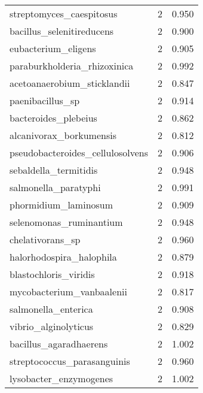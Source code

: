 \begin{tabular}{lrr}
                    streptomyces\_caespitosus &                   2 &     0.950 \\
                   bacillus\_selenitireducens &                   2 &     0.900 \\
                         eubacterium\_eligens &                   2 &     0.905 \\
                paraburkholderia\_rhizoxinica &                   2 &     0.992 \\
                 acetoanaerobium\_sticklandii &                   2 &     0.847 \\
                            paenibacillus\_sp &                   2 &     0.914 \\
                        bacteroides\_plebeius &                   2 &     0.862 \\
                     alcanivorax\_borkumensis &                   2 &     0.812 \\
            pseudobacteroides\_cellulosolvens &                   2 &     0.906 \\
                       sebaldella\_termitidis &                   2 &     0.948 \\
                        salmonella\_paratyphi &                   2 &     0.991 \\
                        phormidium\_laminosum &                   2 &     0.909 \\
                     selenomonas\_ruminantium &                   2 &     0.948 \\
                            chelativorans\_sp &                   2 &     0.960 \\
                    halorhodospira\_halophila &                   2 &     0.879 \\
                       blastochloris\_viridis &                   2 &     0.918 \\
                   mycobacterium\_vanbaalenii &                   2 &     0.817 \\
                         salmonella\_enterica &                   2 &     0.908 \\
                        vibrio\_alginolyticus &                   2 &     0.829 \\
                      bacillus\_agaradhaerens &                   2 &     1.002 \\
                 streptococcus\_parasanguinis &                   2 &     0.960 \\
                      lysobacter\_enzymogenes &                   2 &     1.002 \\

\end{tabular}
